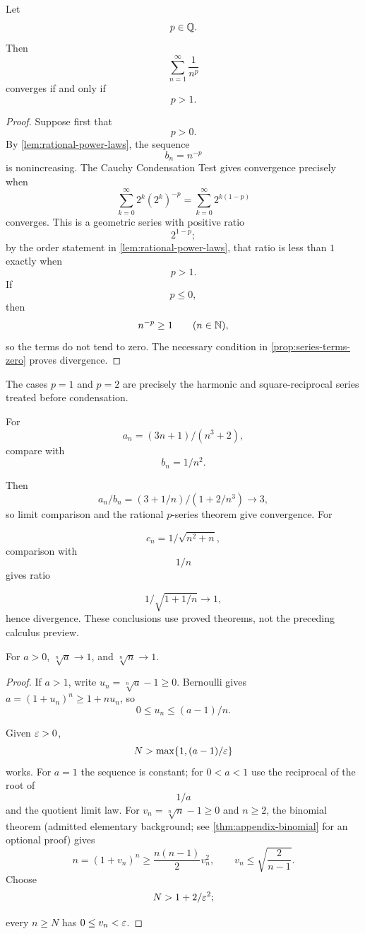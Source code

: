 \begin{theorem}
\label{thm:rational-p-series-test}
Let
\[
p\in\mathbb{Q}.
\]
Then
\[
\sum_{n=1}^{\infty}\frac{1}{n^p}
\]
converges if and only if
\[
p>1.
\]
\end{theorem}
\begin{proof}
Suppose first that
\[
p>0.
\]
By \cref{lem:rational-power-laws}, the sequence
\[
b_n=n^{-p}
\]
is nonincreasing. The Cauchy Condensation Test gives convergence precisely when
\[
\sum_{k=0}^{\infty}2^k(2^k)^{-p}
=\sum_{k=0}^{\infty}2^{k(1-p)}
\]
converges. This is a geometric series with positive ratio
\[
2^{1-p};
\]
by the order statement in \cref{lem:rational-power-laws}, that ratio is less than $1$ exactly when
\[
p>1.
\]
If
\[
p\leq0,
\]
then
\[
n^{-p}\geq1
\qquad(n\in\mathbb{N}),
\]
so the terms do not tend to zero. The necessary condition in \cref{prop:series-terms-zero} proves divergence.
\end{proof}
The cases \(p=1\) and \(p=2\) are precisely the harmonic and
square-reciprocal series treated before condensation.




\begin{example}
For
\[
a_n=(3n+1)/(n^3+2),
\]
 compare with
\[
b_n=1/n^2.
\]

Then
\[
a_n/b_n=(3+1/n)/(1+2/n^3)\to3,
\]
 so limit comparison and
the rational $p$-series theorem give convergence. For

\[
c_n=1/\sqrt{n^2+n},
\]
 comparison with
\[
1/n
\]
 gives ratio

\[
1/\sqrt{1+1/n}\to1,
\]
 hence divergence. These conclusions use
proved theorems, not the preceding calculus preview.
\end{example}

\begin{proposition}
For $a>0$, $\sqrt[n]{a}\to1$, and $\sqrt[n]{n}\to1$.
\end{proposition}
\begin{proof}
If $a>1$, write $u_n=\sqrt[n]{a}-1\geq0$. Bernoulli gives
$a=(1+u_n)^n\geq1+nu_n$, so
\[
0\leq u_n\leq(a-1)/n.
\]

Given $\varepsilon>0$,
\[
N>\max\{1,(a-1)/\varepsilon\}
\]
 works. For $a=1$
the sequence is constant; for $0<a<1$ use the reciprocal of the
root of
\[
1/a
\]
 and the quotient limit law.
For $v_n=\sqrt[n]{n}-1\geq0$ and $n\geq2$, the binomial theorem
(admitted elementary background; see \cref{thm:appendix-binomial}
for an optional proof) gives
\[
n=(1+v_n)^n\geq\frac{n(n-1)}2v_n^2,
\qquad
v_n\leq\sqrt{\frac{2}{n-1}}.
\] Choose
\[
N>1+2/\varepsilon^2;
\]

every $n\geq N$ has $0\leq v_n<\varepsilon$.
\end{proof}

